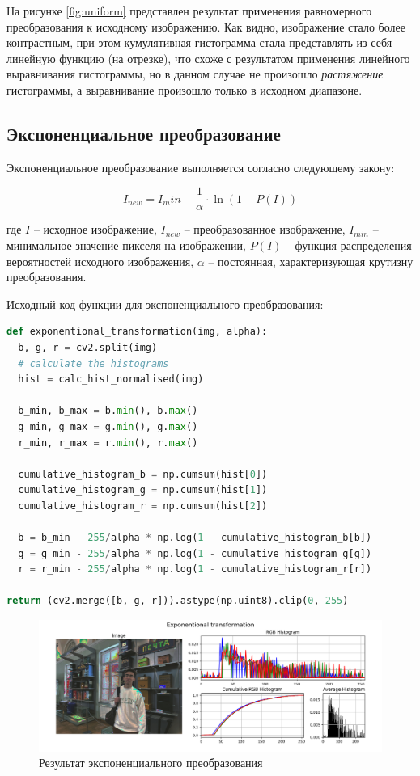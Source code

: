 На рисунке \ref{fig:uniform} представлен результат применения равномерного преобразования к исходному изображению. 
Как видно, изображение стало более контрастным, при этом кумулятивная гистограмма стала представлять из себя
линейную функцию (на отрезке), что схоже с результатом применения линейного выравнивания гистограммы, но 
в данном случае не произошло \textit{растяжение} гистограммы, а выравнивание произошло только в исходном диапазоне. 


\subsection{Экспоненциальное преобразование}

Экспоненциальное преобразование выполняется согласно следующему закону:

\begin{equation}
  I_{new} = I_min - \frac{1}{\alpha} \cdot \ln(1 - P(I))
\end{equation}

где $I$ -- исходное изображение, $I_{new}$ -- преобразованное изображение, 
$I_{min}$ -- минимальное значение пикселя на изображении, 
$P(I)$ -- функция распределения вероятностей исходного изображения,
$\alpha$ -- постоянная, характеризующая крутизну преобразования. 

Исходный код функции для экспоненциального преобразования:

\begin{lstlisting}[language=Python]
def exponentional_transformation(img, alpha):
  b, g, r = cv2.split(img)
  # calculate the histograms
  hist = calc_hist_normalised(img)

  b_min, b_max = b.min(), b.max()
  g_min, g_max = g.min(), g.max()
  r_min, r_max = r.min(), r.max()

  cumulative_histogram_b = np.cumsum(hist[0]) 
  cumulative_histogram_g = np.cumsum(hist[1])
  cumulative_histogram_r = np.cumsum(hist[2])

  b = b_min - 255/alpha * np.log(1 - cumulative_histogram_b[b]) 
  g = g_min - 255/alpha * np.log(1 - cumulative_histogram_g[g]) 
  r = r_min - 255/alpha * np.log(1 - cumulative_histogram_r[r]) 

return (cv2.merge([b, g, r])).astype(np.uint8).clip(0, 255)
\end{lstlisting}

\begin{figure}[H]
    \centering
    \includegraphics[width=\textwidth]{../results/Exponentional transformation.png}
    \caption{Результат экспоненциального преобразования}
    \label{fig:exponentional}
\end{figure}

